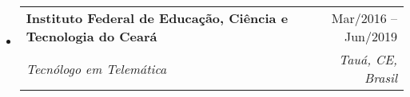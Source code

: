 \documentclass[a4paper,12pt]{article}
\makeatletter
\newcommand{\resumeItem}[1]{%
	\item\small{#1}
}
\newcommand{\resumeItemListStart}{\begin{itemize}[rightmargin=0.11in]}
\newcommand{\resumeItemListEnd}{\end{itemize}}
\newcommand{\resumeTrioHeading}[3]{%
	\item
	\small{%
		\begin{tabular*}{0.96\textwidth}[t]{%
				l@{\extracolsep{\fill}}c@{\extracolsep{\fill}}r
			}
			\textbf{#1} & \textit{#2} & #3
		\end{tabular*}
	}
}
\newcommand{\resumeQuadHeading}[4]{%
	\item
	\begin{tabular*}{0.96\textwidth}[t]{l@{\extracolsep{\fill}}r}
		\textbf{#1} & #2 \\
		\textit{\small#3} & \textit{\small #4} \\
	\end{tabular*}
}
\newcommand{\resumeHeadingListStart}{%
	\begin{itemize}[leftmargin=0.15in, label={}]
}
\newcommand{\resumeHeadingListEnd}{\end{itemize}}
\makeatother
\begin{document}
\resumeHeadingListStart{}

\resumeQuadHeading{Instituto Federal de Educação, Ciência e Tecnologia do Ceará}{Mar/2016 -- Jun/2019}{Tecnólogo em Telemática}{Tauá, CE, Brasil}

\resumeHeadingListEnd{}





\begin{comment}

\section{Projects}

\resumeHeadingListStart{}

\resumeTrioHeading{\href{https://project1.com}{\uline{Project 1}}}{React.js, Redux, PHP, MySQL Git}{\href{https://proect1.com/source-code/}{\uline{Source Code}}}

\resumeItemListStart{}

\resumeItem{Designed and developed a clean and modern website using \textbf{HTML, CSS, and JavaScript}}

\resumeItem{Optimized website for \textbf{speed and user experience}}

\resumeItem{Utilized \textbf{responsive design} to ensure compatibility across all devices}

\resumeItem{Deployed on GitHub pages via GitHub Actions}

\resumeItemListEnd{}


\resumeTrioHeading{Project 2}{Node.js, Express, JavaScript, Git}{\href{https:project2.com/source-code}{\uline{Source Code}}}

\resumeItemListStart{}

\resumeItem{A \textbf{CRUD application} exposed using a RESTful API made with Node.js}

\resumeItem{Exposed POST, GET, PATCH and DELETE HTTP methods using \textbf{Express}}

\resumeItemListEnd{}

\resumeHeadingListEnd{}

\end{comment}
\end{document}
